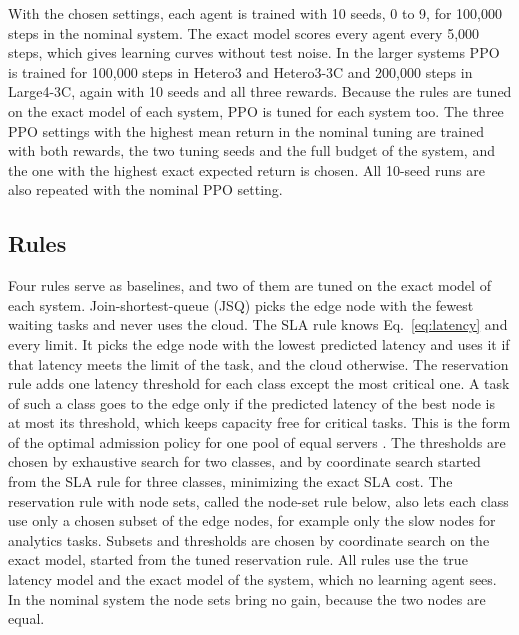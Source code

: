 With the chosen settings, each agent is trained with 10 seeds, 0 to 9, for 100,000 steps in the nominal system. The exact model scores every agent every 5,000 steps, which gives learning curves without test noise. In the larger systems PPO is trained for 100,000 steps in Hetero3 and Hetero3-3C and 200,000 steps in Large4-3C, again with 10 seeds and all three rewards. Because the rules are tuned on the exact model of each system, PPO is tuned for each system too. The three PPO settings with the highest mean return in the nominal tuning are trained with both rewards, the two tuning seeds and the full budget of the system, and the one with the highest exact expected return is chosen. All 10-seed runs are also repeated with the nominal PPO setting.

\subsection{Rules}
Four rules serve as baselines, and two of them are tuned on the exact model of each system. Join-shortest-queue (JSQ) picks the edge node with the fewest waiting tasks and never uses the cloud. The SLA rule knows Eq.~\eqref{eq:latency} and every limit. It picks the edge node with the lowest predicted latency and uses it if that latency meets the limit of the task, and the cloud otherwise. The reservation rule adds one latency threshold for each class except the most critical one. A task of such a class goes to the edge only if the predicted latency of the best node is at most its threshold, which keeps capacity free for critical tasks. This is the form of the optimal admission policy for one pool of equal servers \cite{miller1969}. The thresholds are chosen by exhaustive search for two classes, and by coordinate search started from the SLA rule for three classes, minimizing the exact SLA cost. The reservation rule with node sets, called the node-set rule below, also lets each class use only a chosen subset of the edge nodes, for example only the slow nodes for analytics tasks. Subsets and thresholds are chosen by coordinate search on the exact model, started from the tuned reservation rule. All rules use the true latency model and the exact model of the system, which no learning agent sees. In the nominal system the node sets bring no gain, because the two nodes are equal.

